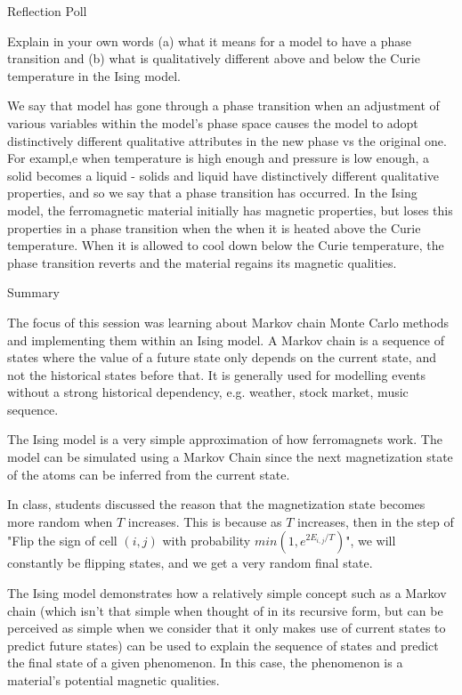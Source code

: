 \documentclass[11pt]{article}
\begin{document}
    
    Reflection Poll

Explain in your own words (a) what it means for a model to have a phase
transition and (b) what is qualitatively different above and below the
Curie temperature in the Ising model.

We say that model has gone through a phase transition when an adjustment
of various variables within the model's phase space causes the model to
adopt distinctively different qualitative attributes in the new phase vs
the original one. For exampl,e when temperature is high enough and
pressure is low enough, a solid becomes a liquid - solids and liquid
have distinctively different qualitative properties, and so we say that
a phase transition has occurred. In the Ising model, the ferromagnetic
material initially has magnetic properties, but loses this properties in
a phase transition when the when it is heated above the Curie
temperature. When it is allowed to cool down below the Curie
temperature, the phase transition reverts and the material regains its
magnetic qualities.

    Summary

The focus of this session was learning about Markov chain Monte Carlo
methods and implementing them within an Ising model. A Markov chain is a
sequence of states where the value of a future state only depends on the
current state, and not the historical states before that. It is
generally used for modelling events without a strong historical
dependency, e.g. weather, stock market, music sequence.

The Ising model is a very simple approximation of how ferromagnets work.
The model can be simulated using a Markov Chain since the next
magnetization state of the atoms can be inferred from the current state.

In class, students discussed the reason that the magnetization state
becomes more random when \(T\) increases. This is because as \(T\)
increases, then in the step of "Flip the sign of cell \((i, j)\) with
probability \(min(1, e^{2E_{i,j}/T} )\)", we will constantly be flipping
states, and we get a very random final state.

The Ising model demonstrates how a relatively simple concept such as a
Markov chain (which isn't that simple when thought of in its recursive
form, but can be perceived as simple when we consider that it only makes
use of current states to predict future states) can be used to explain
the sequence of states and predict the final state of a given
phenomenon. In this case, the phenomenon is a material's potential
magnetic qualities.


    
    
    
    
\end{document}

